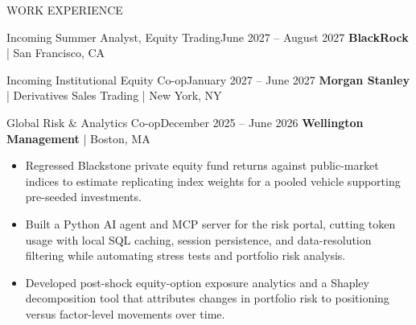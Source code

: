 \documentclass[]{mcdowellcv}
\begin{document}
\vspace{-2.5mm}
\begin{cvsection}{WORK EXPERIENCE}
\vspace{1mm}

	\begin{cvsubsection}{Incoming Summer Analyst, Equity Trading}{}{June 2027 -- August 2027}
		\textbf{BlackRock} | San Francisco, CA
	\end{cvsubsection}

	\begin{cvsubsection}{Incoming Institutional Equity Co-op}{}{January 2027 -- June 2027}
		\textbf{Morgan Stanley} | Derivatives Sales Trading | New York, NY
	\end{cvsubsection}

	\begin{cvsubsection}{Global Risk \& Analytics Co-op}{}{December 2025 -- June 2026}
		\textbf{Wellington Management} | Boston, MA
		\begin{itemize}
			\item Regressed Blackstone private equity fund returns against public-market indices to estimate replicating index weights for a pooled vehicle supporting pre-seeded investments.
			\item Built a Python AI agent and MCP server for the risk portal, cutting token usage with local SQL caching, session persistence, and data-resolution filtering while automating stress tests and portfolio risk analysis.
			\item Developed post-shock equity-option exposure analytics and a Shapley decomposition tool that attributes changes in portfolio risk to positioning versus factor-level movements over time.
		\end{itemize}
	\end{cvsubsection}


\end{cvsection}
\end{document}

